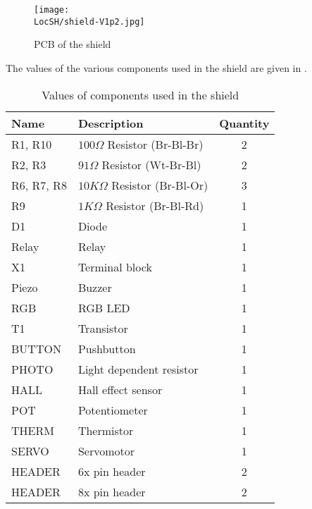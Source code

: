 \begin{figure}
  \centering
  \texttt{[image: \\LocSH/shield-V1p2.jpg]}
  \caption{PCB of the shield}
  \label{fig:shield-photo}
\end{figure}
The values of the various components used in the shield are given in
.
\begin{table}
  \centering
  \caption{Values of components used in the shield}
  \label{tab:shield-values}
  \begin{tabular}{llc} \hline
    Name       & Description                     & Quantity \\ \hline
    R1, R10    & $100\Omega$ Resistor (Br-Bl-Br) & 2        \\
    R2, R3     & $91\Omega$ Resistor (Wt-Br-Bl)  & 2        \\
    R6, R7, R8 & $10K\Omega$ Resistor (Br-Bl-Or) & 3        \\
    R9         & $1K\Omega$ Resistor (Br-Bl-Rd)  & 1        \\
    D1         & Diode                           & 1        \\
    Relay      & Relay                           & 1        \\
    X1         & Terminal block                  & 1        \\
    Piezo      & Buzzer                          & 1        \\
    RGB        & RGB LED                         & 1        \\
    T1         & Transistor                      & 1        \\
    BUTTON     & Pushbutton                      & 1        \\
    PHOTO      & Light dependent resistor        & 1        \\
    HALL       & Hall effect sensor              & 1        \\
    POT        & Potentiometer                   & 1        \\
    THERM      & Thermistor                      & 1        \\
    SERVO      & Servomotor                      & 1        \\
    HEADER     & 6x pin header                   & 2        \\
    HEADER     & 8x pin header                   & 2        \\
    \hline
  \end{tabular}
\end{table}
